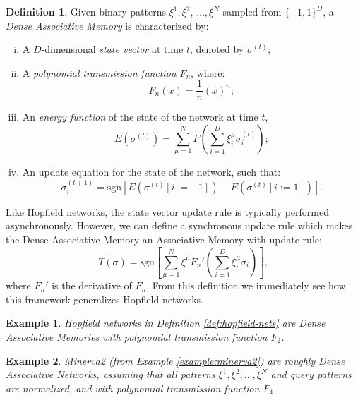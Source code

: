 \documentclass{article}
\newtheorem{example}{Example}[subsection]
\theoremstyle{definition}
\newtheorem{definition}{Definition}[subsection]
\begin{document}
\begin{definition}
  Given binary patterns $\xi^1, \xi^2$, $\dots, \xi^N$ sampled from
  $\{-1, 1\}^D$,
  a \textit{Dense Associative Memory} is characterized by:
  \begin{enumerate}[(i)]
    \item A $D$-dimensional \textit{state vector} at time $t$, denoted by $\sigma^{(t)}$;
    \item A \textit{polynomial transmission function} $F_n$, where:
      \begin{equation}
        F_n (x) = \frac{1}{n} (x)^n;
      \end{equation}
    \item An \textit{energy function} of the state of the network at time $t$,
      \begin{equation}
        E(\sigma^{(t)}) = \sum^N_{\mu=1} F \left( \sum^D_{i=1}
        \xi^\mu_i \sigma^{(t)}_i \right);
      \end{equation}
    \item An update equation for the state of the network, such that:
      \begin{equation}
        \sigma^{(t+1)}_i = \text{sgn} \left[ E(\sigma^{(t)}[i := -1])
        - E(\sigma^{(t)}[i := 1]) \right].
      \end{equation}
  \end{enumerate}
\end{definition}

Like Hopfield networks, the state vector update rule is typically
performed asynchronously.
However, we can define a synchronous update rule which makes the
Dense Associative
Memory an Associative Memory with update rule:
\begin{equation}
  T(\sigma) = \text{sgn} \left[\sum^N_{\mu=1} \xi^\mu F_n' \left(
  \sum^D_{i=1} \xi^\mu_i \sigma_i \right)\right],
\end{equation}
where $F_n'$ is the derivative of $F_n$. From this definition we immediately
see how this framework generalizes Hopfield networks.

\begin{example}
  Hopfield networks in Definition \ref{def:hopfield-nets} are Dense
  Associative Memories
  with polynomial transmission function $F_2$.
\end{example}

\begin{example}
  Minerva2 (from Example \ref{example:minerva2}) are roughly Dense
  Associative Networks,
  assuming that all patterns $\xi^1, \xi^2, \dots, \xi^N$ and query
  patterns are normalized,
  and with polynomial transmission function $F_4$.
\end{example}
\end{document}
